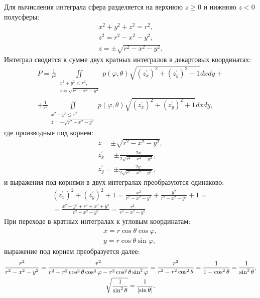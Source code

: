 Для вычисления интеграла сфера разделяется на верхнюю $z \ge 0$ и нижнюю $z < 0$ полусферы:
\begin{gather*}
    x^2 + y^2 + z^2 = r^2 , \\
    z^2 = r^2 - x^2 - y^2 , \\
    z = \pm \sqrt{r^2 - x^2 - y^2} .
\end{gather*}
Интеграл сводится к сумме двух кратных интегралов в декартовых координатах:
\begin{multline*}
    P
    = \frac{1}{r^2} \iint
    \limits_{
        \begin{array}{c}
            x^2 + y^2 \le r^2, \\
            z = \sqrt{r^2 - x^2 - y^2}
        \end{array}
    } p(\varphi, \theta) \sqrt{(z_x^\prime)^2 + (z_y^\prime)^2 + 1} dxdy + \\
    + \frac{1}{r^2} \iint
    \limits_{
        \begin{array}{c}
            x^2 + y^2 \le r^2, \\
            z = - \sqrt{r^2 - x^2 - y^2}
        \end{array}
    } p(\varphi, \theta) \sqrt{(z_x^\prime)^2 + (z_y^\prime)^2 + 1} dxdy ,
\end{multline*}
где производные под корнем:
\begin{gather*}
    z = \pm \sqrt{r^2 - x^2 - y^2} , \\
    z_x^\prime = \pm \frac{-2 x}{2 \sqrt{r^2 - x^2 - y^2}} , \\
    z_y^\prime = \pm \frac{-2 y}{2 \sqrt{r^2 - x^2 - y^2}} ,
\end{gather*}
и выражения под корнями в двух интегралах преобразуются одинаково:
\begin{multline*}
    (z_x^\prime)
    ^2 + (z_y^\prime)^2 + 1
    = \frac{x^2}{r^2 - x^2 - y^2} + \frac{y^2}{r^2 - x^2 - y^2} + 1 = \\
    = \frac{x^2 + y^2 + r^2 + x^2 + y^2}{r^2 - x^2 - y^2}
    = \frac{r^2}{r^2 - x^2 - y^2}
\end{multline*}
При переходе в кратных интегралах к угловым координатам:
\begin{gather*}
    x = r \cos \theta \cos \varphi , \\
    y = r \cos \theta \sin \varphi ,
\end{gather*}
выражение под корнем преобразуется далее:
\begin{gather*}
    \frac{r^2}{r^2 - x^2 - y^2}
    = \frac{r^2}{r^2 - r^2 \cos^2 \theta \cos^2 \varphi - r^2 \cos^2 \theta \sin^2 \varphi}
    = \frac{r^2}{r^2 - r^2 \cos^2 \theta}
    = \frac{1}{1 - \cos^2 \theta}
    = \frac{1}{\sin^2 \theta} , \\
    \sqrt{\frac{1}{\sin^2 \theta}}
    = \frac{1}{\left | \sin \theta \right |} .
\end{gather*}
